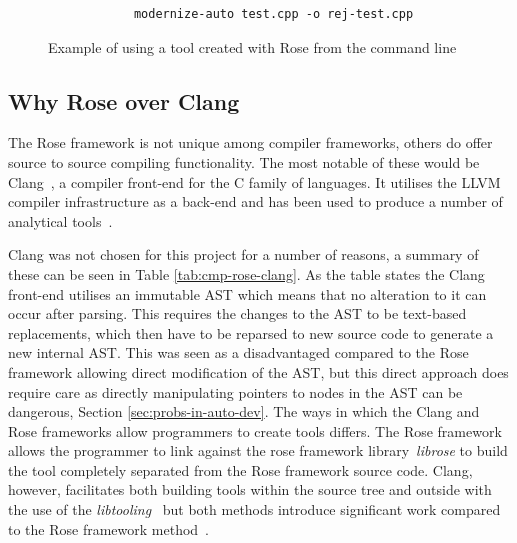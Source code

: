 \documentclass[bsc,frontabs,singlespacing,twoside,parskip,deptreport]{infthesis}
\begin{document}
\begin{figure}[!h]
    \centering
    \begin{verbatim}
            modernize-auto test.cpp -o rej-test.cpp
    \end{verbatim}
    \caption{Example of using a tool created with Rose from the command line}
    \label{fig:cmd-opt}
\end{figure}

    
\subsection{Why Rose over Clang}
The Rose framework is not unique among compiler frameworks, others do offer source to source compiling functionality. The most notable of these would be Clang~\cite{CLANG}, a compiler front-end for the C family of languages. It utilises the LLVM compiler infrastructure as a back-end and has been used to produce a number of analytical tools~\cite{CLANG_TOOLS}. 

Clang was not chosen for this project for a number of reasons, a summary of these can be seen in Table \ref{tab:cmp-rose-clang}. As the table states the Clang front-end utilises an immutable AST which means that no alteration to it can occur after parsing. This requires the changes to the AST to be text-based replacements, which then have to be reparsed to new source code to generate a new internal AST. This was seen as a disadvantaged compared to the Rose framework allowing direct modification of the AST, but this direct approach does require care as directly manipulating pointers to nodes in the AST can be dangerous, Section \ref{sec:probs-in-auto-dev}. The ways in which the Clang and Rose frameworks allow programmers to create tools differs. The Rose framework allows the programmer to link against the rose framework library~\textit{librose} to build the tool completely separated from the Rose framework source code. Clang, however, facilitates both building tools within the source tree and outside with the use of the \textit{libtooling}~\cite{CLANG_TOOLS_LIB} but both methods introduce significant work compared to the Rose framework method~\cite{ROSE_MAKE}. 
\end{document}
